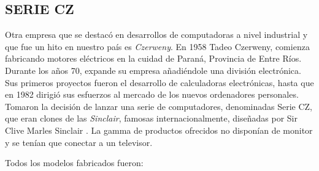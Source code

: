 \documentclass[%
 	final,
%
	notitlepage,
	narroweqnarray,
	inline,
 	twoside,
	]{ieee}
\begin{document}
\subsection*{SERIE CZ}

Otra empresa que se destac\'o en desarrollos de computadoras a nivel industrial y que fue un hito en nuestro pa\'is es \textit{Czerweny}. En 1958 Tadeo Czerweny, comienza fabricando motores el\'ectricos en la cuidad de Paran\'a, Provincia de Entre R\'ios. Durante los a\~nos 70, expande su empresa a\~nadi\'endole una divisi\'on electr\'onica. Sus primeros proyectos fueron el desarrollo de calculadoras electr\'onicas, hasta que en 1982 dirigi\'o sus esfuerzos al mercado de los nuevos ordenadores personales. Tomaron la decisi\'on de lanzar una serie de computadores, denominadas Serie CZ, que eran clones de las \textit{Sinclair}, famosas internacionalmente, dise\~nadas por Sir Clive Marles Sinclair \cite{sinclair}.
La gamma de productos ofrecidos no dispon\'ian de monitor y se ten\'ian que conectar a un televisor. 

Todos los modelos fabricados fueron:\\
\end{document}
